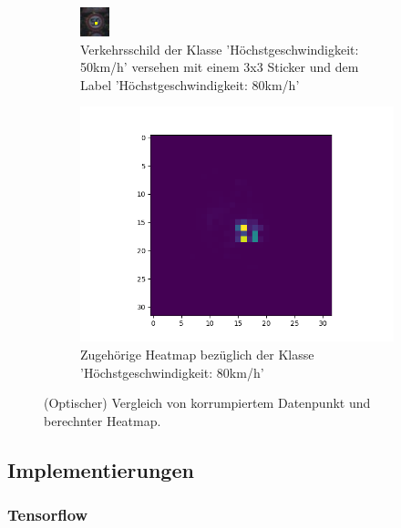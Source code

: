 \documentclass[twoside, 11pt,a4paper]{article}
\numberwithin{equation}{section}
\begin{document}
	\begin{figure}
		\centering
		\begin{subfigure}{.5\textwidth}
			\centering
			\includegraphics[width=.4\linewidth]{1450_poison}
			\caption{Verkehrsschild der Klasse 'Höchstgeschwindigkeit: 50km/h' versehen mit einem 3x3 Sticker und dem Label 'Höchstgeschwindigkeit: 80km/h'}
			
		\end{subfigure}%
		\begin{subfigure}{.5\textwidth}
			\centering
			\includegraphics[width=.7\linewidth]{1450_poison_lrp.png}
			\caption{Zugehörige Heatmap bezüglich der Klasse 'Höchstgeschwindigkeit: 80km/h'}
			
		\end{subfigure}
		\caption{(Optischer) Vergleich von korrumpiertem Datenpunkt und berechnter Heatmap.}
		\label{vergleich_original_lrp}
	\end{figure}
	\subsection{Implementierungen}
	
	\subsubsection{Tensorflow}
\end{document}
